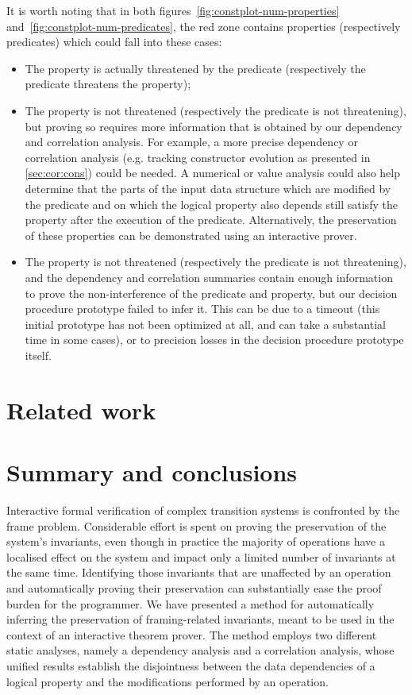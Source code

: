 \documentclass[11pt]{article}
\begin{document}
It is  worth noting  that in both figures~\ref{fig:constplot-num-properties}
and~\ref{fig:constplot-num-predicates},  the   red   zone contains
properties (respectively predicates) which could fall into these cases:
\begin{itemize}
\item  The  property is  actually  threatened  by  the predicate  (respectively  the
  predicate threatens the property);
\item  The  property   is  not  threatened  (respectively the predicate  is  not
  threatening), but proving so requires  more information that is obtained by
  our  dependency and  correlation  analysis.  For  example,  a more  precise
  dependency or correlation analysis  (e.g. tracking constructor evolution as
  presented in  \ref{sec:cor:cons}) could  be needed.   A numerical  or value
  analysis  could also  help  determine  that the  parts  of  the input  data
  structure which  are modified  by the  predicate and  on which  the logical
  property also depends still satisfy the property after the execution of the
  predicate.   Alternatively, the  preservation  of these  properties can  be
  demonstrated using an interactive prover.
\item  The  property   is  not  threatened  (respectively the predicate  is  not
  threatening), and  the dependency and correlation  summaries contain enough
  information to  prove the non-interference  of the predicate  and property,
  but our decision procedure prototype failed to infer it. This can be due to
  a timeout  (this initial prototype has  not been optimized at  all, and can
  take  a substantial  time in  some cases),  or to  precision losses  in the
  decision procedure prototype itself.
\end{itemize}


\section{Related work}

\section{Summary and conclusions}

Interactive formal verification of complex transition systems is
confronted by the frame problem. Considerable effort is spent on
proving the preservation of the system's invariants, even though in
practice the majority of operations have a localised effect on the
system and impact only a limited number of invariants at the same
time. Identifying those invariants that are unaffected by an operation
and automatically proving their preservation can substantially ease
the proof burden for the programmer. We have presented
a method for automatically inferring the preservation of
framing-related invariants, meant to be used in the context of
an interactive theorem prover. The method employs two different static
analyses, namely a dependency analysis and a correlation analysis,
whose unified results  establish the disjointness between
the data dependencies of a logical property and the modifications
performed by an operation.
\end{document}
